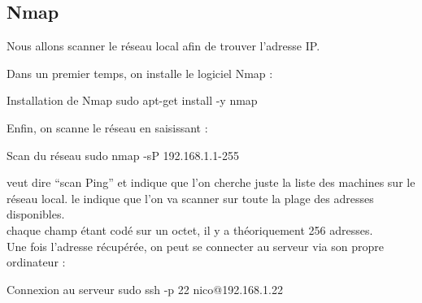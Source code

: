 \subsection{Nmap}
Nous allons scanner le réseau local afin de trouver l’adresse IP.


Dans un premier temps, on installe le logiciel Nmap :
\begin{Bash}{Installation de Nmap}
sudo apt-get install -y nmap
\end{Bash}


Enfin, on scanne le réseau en saisissant :
\begin{Bash}{Scan du réseau}
sudo nmap -sP 192.168.1.1-255 
\end{Bash}

 veut dire “scan Ping” et indique que l’on cherche juste la liste des machines sur le réseau local.
le  indique que l’on va scanner sur toute la plage des adresses disponibles. \\
chaque champ étant codé sur un octet, il y  a théoriquement 256 adresses. \\


Une fois l’adresse récupérée, on peut se connecter au serveur via son propre ordinateur :
\begin{Bash}{Connexion au serveur}
sudo ssh -p 22 nico@192.168.1.22
\end{Bash}
